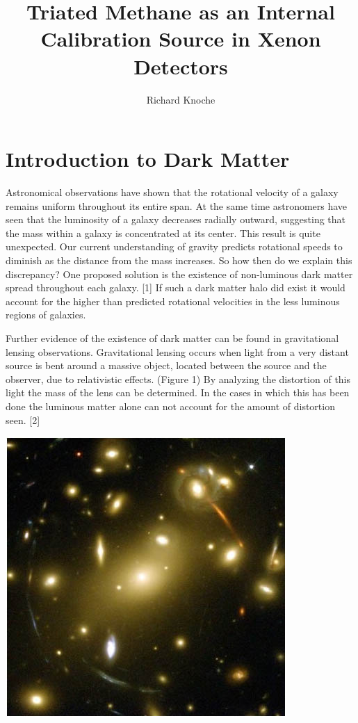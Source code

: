 \documentclass[a4paper,12pt]{article}
\begin{document}
\title{Triated Methane as an Internal Calibration Source in Xenon Detectors}
\author{Richard Knoche}
\maketitle

\tableofcontents

\section{Introduction to Dark Matter}
Astronomical observations have shown that the rotational velocity of a galaxy remains uniform throughout its entire span.  At the same time astronomers have seen that the luminosity of a galaxy decreases radially outward, suggesting that the mass within a galaxy is concentrated at its center.  This result is quite unexpected.  Our current understanding of gravity predicts rotational speeds to diminish as the distance from the mass increases. So how then do we explain this discrepancy?  One proposed solution is the existence of non-luminous dark matter spread throughout each galaxy. [1] If such a dark matter halo did exist it would account for the higher than predicted rotational velocities in the less luminous regions of galaxies. 

Further evidence of the existence of dark matter can be found in gravitational lensing observations.  Gravitational lensing occurs when light from a very distant source is bent around a massive object, located between the source and the observer, due to relativistic effects. (Figure 1)  By analyzing the distortion of this light the mass of the lens can be determined.  In the cases in which this has been done the luminous matter alone can not account for the amount of distortion seen. [2]

\begin{center}
\includegraphics[scale=0.5]{lensing.jpg}
\end{center}
\end{document}
